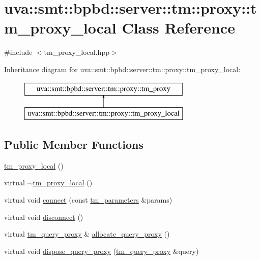 \hypertarget{classuva_1_1smt_1_1bpbd_1_1server_1_1tm_1_1proxy_1_1tm__proxy__local}{}\section{uva\+:\+:smt\+:\+:bpbd\+:\+:server\+:\+:tm\+:\+:proxy\+:\+:tm\+\_\+proxy\+\_\+local Class Reference}
\label{classuva_1_1smt_1_1bpbd_1_1server_1_1tm_1_1proxy_1_1tm__proxy__local}


{\ttfamily \#include $<$tm\+\_\+proxy\+\_\+local.\+hpp$>$}

Inheritance diagram for uva\+:\+:smt\+:\+:bpbd\+:\+:server\+:\+:tm\+:\+:proxy\+:\+:tm\+\_\+proxy\+\_\+local\+:\begin{figure}[H]
\begin{center}
\leavevmode
\includegraphics[height=2.000000cm]{classuva_1_1smt_1_1bpbd_1_1server_1_1tm_1_1proxy_1_1tm__proxy__local}
\end{center}
\end{figure}
\subsection*{Public Member Functions}
\begin{DoxyCompactItemize}
\item 
\hyperlink{classuva_1_1smt_1_1bpbd_1_1server_1_1tm_1_1proxy_1_1tm__proxy__local_aa713e38d275c6d6c47e4e437f4c196d3}{tm\+\_\+proxy\+\_\+local} ()
\item 
virtual \hyperlink{classuva_1_1smt_1_1bpbd_1_1server_1_1tm_1_1proxy_1_1tm__proxy__local_a1438086facfafb8ad22b381232e6e474}{$\sim$tm\+\_\+proxy\+\_\+local} ()
\item 
virtual void \hyperlink{classuva_1_1smt_1_1bpbd_1_1server_1_1tm_1_1proxy_1_1tm__proxy__local_a5d77b90071d5ea0c80072a4b14125edf}{connect} (const \hyperlink{structuva_1_1smt_1_1bpbd_1_1server_1_1tm_1_1tm__parameters}{tm\+\_\+parameters} \&params)
\item 
virtual void \hyperlink{classuva_1_1smt_1_1bpbd_1_1server_1_1tm_1_1proxy_1_1tm__proxy__local_a000e14c8242bbe551cdc074c79ef0b89}{disconnect} ()
\item 
virtual \hyperlink{classuva_1_1smt_1_1bpbd_1_1server_1_1tm_1_1proxy_1_1tm__query__proxy}{tm\+\_\+query\+\_\+proxy} \& \hyperlink{classuva_1_1smt_1_1bpbd_1_1server_1_1tm_1_1proxy_1_1tm__proxy__local_a5d5b8fbfe884af27c390e38b065f399c}{allocate\+\_\+query\+\_\+proxy} ()
\item 
virtual void \hyperlink{classuva_1_1smt_1_1bpbd_1_1server_1_1tm_1_1proxy_1_1tm__proxy__local_af91a15abfca464b58f7e752ebc258364}{dispose\+\_\+query\+\_\+proxy} (\hyperlink{classuva_1_1smt_1_1bpbd_1_1server_1_1tm_1_1proxy_1_1tm__query__proxy}{tm\+\_\+query\+\_\+proxy} \&query)
\end{DoxyCompactItemize}
